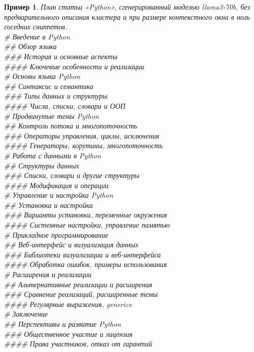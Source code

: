 \documentclass{article}
\theoremstyle{definition}
\theoremstyle{plain}
\newtheorem{remark}{Пример}
\begin{document}
\begin{remark}
План статьи «Python», сгенерированный моделью llama3-70b, без предварительного описания кластера и при размере контекстного окна в ноль соседних сниппетов.\\
\# Введение в Python\\
\#\# Обзор языка\\
\#\#\# История и основные аспекты\\
\#\#\#\# Ключевые особенности и реализации\\
\# Основы языка Python\\
\#\# Синтаксис и семантика\\
\#\#\# Типы данных и структуры\\
\#\#\#\# Числа, списки, словари и ООП\\
\# Продвинутые темы Python\\
\#\# Контроль потока и многопоточность\\
\#\#\# Операторы управления, циклы, исключения\\
\#\#\#\# Генераторы, корутины, многопоточность\\
\# Работа с данными в Python\\
\#\# Структуры данных\\
\#\#\# Списки, словари и другие структуры\\
\#\#\#\# Модификация и операции\\
\# Управление и настройка Python\\
\#\# Установка и настройка\\
\#\#\# Варианты установки, переменные окружения\\
\#\#\#\# Системные настройки, управление памятью\\
\# Прикладное программирование\\
\#\# Веб-интерфейс и визуализация данных\\
\#\#\# Библиотеки визуализации и веб-интерфейса\\
\#\#\#\# Обработка ошибок, примеры использования\\
\# Расширения и реализации\\
\#\# Альтернативные реализации и расширения\\
\#\#\# Сравнение реализаций, расширенные темы\\
\#\#\#\# Регулярные выражения, generics\\
\# Заключение\\
\#\# Перспективы и развитие Python\\
\#\#\# Общественное участие и лицензия\\
\#\#\#\# Права участников, отказ от гарантий\\
\end{remark}
\end{document}
